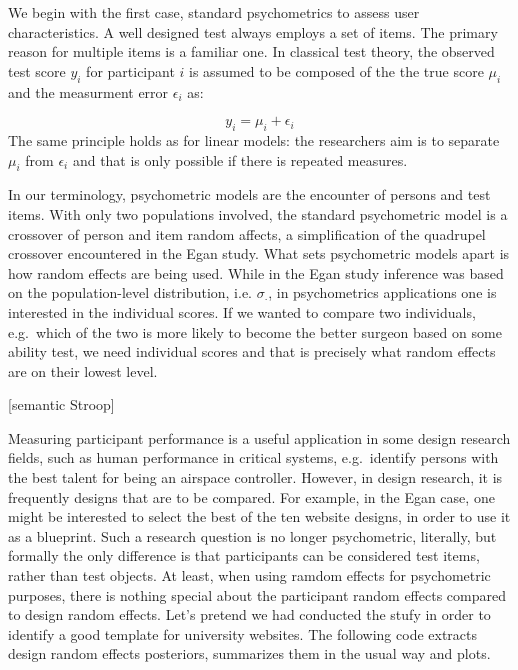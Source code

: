 \documentclass[]{svmono}
\theoremstyle{definition}
\theoremstyle{definition}
\theoremstyle{definition}
\theoremstyle{remark}
\begin{document}
We begin with the first case, standard psychometrics to assess user
characteristics. A well designed test always employs a set of items. The
primary reason for multiple items is a familiar one. In classical test
theory, the observed test score \(y_i\) for participant \(i\) is assumed
to be composed of the the true score \(\mu_i\) and the measurment error
\(\epsilon_i\) as:

\[y_i = \mu_i + \epsilon_i\] The same principle holds as for linear
models: the researchers aim is to separate \(\mu_i\) from \(\epsilon_i\)
and that is only possible if there is repeated measures.

In our terminology, psychometric models are the encounter of persons and
test items. With only two populations involved, the standard
psychometric model is a crossover of person and item random affects, a
simplification of the quadrupel crossover encountered in the Egan study.
What sets psychometric models apart is how random effects are being
used. While in the Egan study inference was based on the
population-level distribution, i.e. \(\sigma_\cdot\), in psychometrics
applications one is interested in the individual scores. If we wanted to
compare two individuals, e.g.~which of the two is more likely to become
the better surgeon based on some ability test, we need individual scores
and that is precisely what random effects are on their lowest level.

{[}semantic Stroop{]}

Measuring participant performance is a useful application in some design
research fields, such as human performance in critical systems,
e.g.~identify persons with the best talent for being an airspace
controller. However, in design research, it is frequently designs that
are to be compared. For example, in the Egan case, one might be
interested to select the best of the ten website designs, in order to
use it as a blueprint. Such a research question is no longer
psychometric, literally, but formally the only difference is that
participants can be considered test items, rather than test objects. At
least, when using ramdom effects for psychometric purposes, there is
nothing special about the participant random effects compared to design
random effects. Let's pretend we had conducted the stufy in order to
identify a good template for university websites. The following code
extracts design random effects posteriors, summarizes them in the usual
way and plots.
\end{document}
